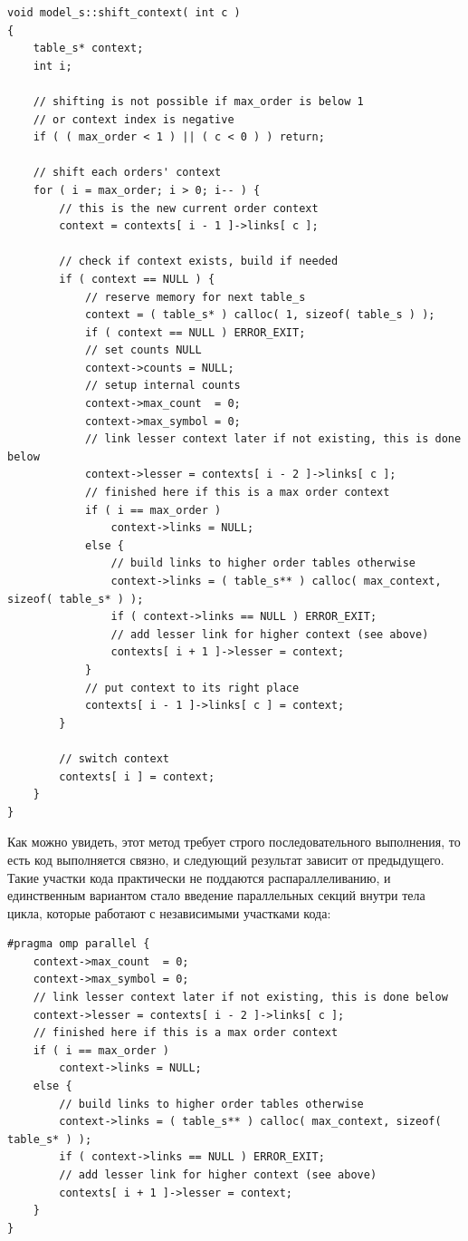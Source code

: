 \documentclass{matmex-diploma-custom}
\begin{document}
\begin{lstlisting}
void model_s::shift_context( int c )
{
    table_s* context;
    int i;

    // shifting is not possible if max_order is below 1
    // or context index is negative
    if ( ( max_order < 1 ) || ( c < 0 ) ) return;

    // shift each orders' context
    for ( i = max_order; i > 0; i-- ) {
        // this is the new current order context
        context = contexts[ i - 1 ]->links[ c ];

        // check if context exists, build if needed
        if ( context == NULL ) {
            // reserve memory for next table_s
            context = ( table_s* ) calloc( 1, sizeof( table_s ) );
            if ( context == NULL ) ERROR_EXIT;
            // set counts NULL
            context->counts = NULL;
            // setup internal counts
            context->max_count  = 0;
            context->max_symbol = 0;
            // link lesser context later if not existing, this is done below
            context->lesser = contexts[ i - 2 ]->links[ c ];
            // finished here if this is a max order context
            if ( i == max_order )
                context->links = NULL;
            else {
                // build links to higher order tables otherwise
                context->links = ( table_s** ) calloc( max_context, sizeof( table_s* ) );
                if ( context->links == NULL ) ERROR_EXIT;
                // add lesser link for higher context (see above)
                contexts[ i + 1 ]->lesser = context;
            }
            // put context to its right place
            contexts[ i - 1 ]->links[ c ] = context;
        }

        // switch context
        contexts[ i ] = context;
    }
}
\end{lstlisting}

Как можно увидеть, этот метод требует строго последовательного выполнения, то есть код выполняется связно, и следующий результат зависит от предыдущего. Такие участки кода практически не поддаются распараллеливанию, и единственным вариантом стало введение параллельных секций внутри тела цикла, которые работают с независимыми участками кода:

\begin{lstlisting}
#pragma omp parallel {
    context->max_count  = 0;
    context->max_symbol = 0;
    // link lesser context later if not existing, this is done below
    context->lesser = contexts[ i - 2 ]->links[ c ];
    // finished here if this is a max order context
    if ( i == max_order )
        context->links = NULL;
    else {
        // build links to higher order tables otherwise
        context->links = ( table_s** ) calloc( max_context, sizeof( table_s* ) );
        if ( context->links == NULL ) ERROR_EXIT;
        // add lesser link for higher context (see above)
        contexts[ i + 1 ]->lesser = context;
    }
}
\end{lstlisting}
\end{document}
